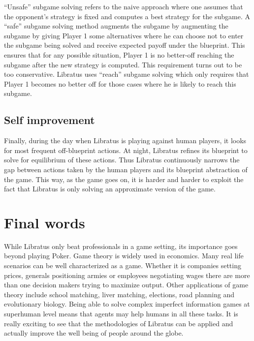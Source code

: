 \documentclass[10pt,a4paper]{article}
\begin{document}
``Unsafe'' subgame solving refers to the naive approach where one assumes that the opponent's strategy is fixed and computes a best strategy for the subgame. A ``safe'' subgame solving method augments the subgame by augmenting the subgame by giving Player 1 some alternatives where he can choose not to enter the subgame being solved and receive expected payoff under the blueprint. This ensures that for any possible situation, Player 1 is no better-off reaching the subgame after the new strategy is computed. This requirement turns out to be too conservative. Libratus uses ``reach'' subgame solving which only requires that Player 1 becomes no better off for those cases where he is likely to reach this subgame.

\subsection{Self improvement}
Finally, during the day when Libratus is playing against human players, it looks for most frequent off-blueprint actions. At night, Libratus refines its blueprint to solve for equilibrium of these actions. Thus Libratus continuously narrows the gap between actions taken by the human players and its blueprint abstraction of the game. This way, as the game goes on, it is harder and harder to exploit the fact that Libratus is only solving an approximate version of the game.

\section{Final words}
While Libratus only beat professionals in a game setting, its importance goes beyond playing Poker. Game theory is widely used in economics. Many real life scenarios can be well characterized as a game. Whether it is companies setting prices, generals positioning armies or employees negotiating wages there are more than one decision makers trying to maximize output. Other applications of game theory include school matching, liver matching, elections, road planning and evolutionary biology. Being able to solve complex imperfect information games at superhuman level means that agents may help humans in all these tasks. It is really exciting to see that the methodologies of Libratus can be applied and actually improve the well being of people around the globe.


\newpage


\end{document}
